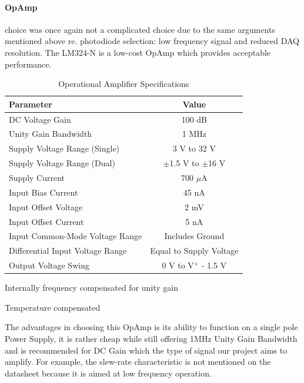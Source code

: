 \paragraph{\acf{OpAmp}} choice was once again not a complicated choice due to the same arguments mentioned above re. photodiode selection: low frequency signal and reduced DAQ resolution. The LM324-N is a low-cost \ac{OpAmp} which provides acceptable performance. 
%
%
\begin{table}[htbp]
  \centering
  \caption{Operational Amplifier Specifications}
  \begin{tabular}{|l|c|}
  \hline
  \textbf{Parameter} & \textbf{Value} \\
  \hline
  DC Voltage Gain & 100 dB \\
  \hline
  Unity Gain Bandwidth & 1 MHz \\
  \hline
  Supply Voltage Range (Single) & 3 V to 32 V \\
  \hline
  Supply Voltage Range (Dual) & $\pm$1.5 V to $\pm$16 V \\
  \hline
  Supply Current & 700 $\mu$A \\
  \hline
  Input Bias Current & 45 nA \\
  \hline
  Input Offset Voltage & 2 mV \\
  \hline
  Input Offset Current & 5 nA \\
  \hline
  Input Common-Mode Voltage Range & Includes Ground \\
  \hline
  Differential Input Voltage Range & Equal to Supply Voltage \\
  \hline
  Output Voltage Swing & 0 V to V$^{+}$ - 1.5 V \\
  \hline
  \end{tabular}
  \begin{tablenotes}
  \small
  \item Internally frequency compensated for unity gain
  \item Temperature compensated
  \end{tablenotes}
\end{table}
The advantages in choosing this \ac{OpAmp} is its ability to function on a single pole Power Supply, it is rather cheap while still offering 1MHz Unity Gain Bandwidth and is recommended for DC Gain which the type of signal our project aims to amplify. For example, the slew-rate characteristic is not mentioned on the datasheet because it is aimed at low frequency operation.



